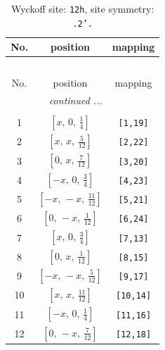 \documentclass[fleqn,8pt]{jsarticle}
\begin{document}
\begin{longtable}{ccc}
\caption{Wyckoff site: {\tt 12h}, site symmetry: {\tt .2'.}}
 \\
 \hline \hline
No. & position & mapping \\ \hline \endfirsthead

\multicolumn{2}{l}{\tablename\ \thetable{}} \\
 \hline \hline
No. & position & mapping \\ \hline \endhead

 \hline \hline
\multicolumn{2}{r}{\footnotesize\it continued ...} \\ \endfoot

 \hline \hline
\multicolumn{2}{r}{} \\ \endlastfoot

1 & $\left[ x,\, 0,\, \frac{1}{4} \right]$ & {\tt [1,19]} \\ \hline
2 & $\left[ x,\, x,\, \frac{5}{12} \right]$ & {\tt [2,22]} \\ \hline
3 & $\left[ 0,\, x,\, \frac{7}{12} \right]$ & {\tt [3,20]} \\ \hline
4 & $\left[ - x,\, 0,\, \frac{3}{4} \right]$ & {\tt [4,23]} \\ \hline
5 & $\left[ - x,\, - x,\, \frac{11}{12} \right]$ & {\tt [5,21]} \\ \hline
6 & $\left[ 0,\, - x,\, \frac{1}{12} \right]$ & {\tt [6,24]} \\ \hline
7 & $\left[ x,\, 0,\, \frac{3}{4} \right]$ & {\tt [7,13]} \\ \hline
8 & $\left[ 0,\, x,\, \frac{1}{12} \right]$ & {\tt [8,15]} \\ \hline
9 & $\left[ - x,\, - x,\, \frac{5}{12} \right]$ & {\tt [9,17]} \\ \hline
10 & $\left[ x,\, x,\, \frac{11}{12} \right]$ & {\tt [10,14]} \\ \hline
11 & $\left[ - x,\, 0,\, \frac{1}{4} \right]$ & {\tt [11,16]} \\ \hline
12 & $\left[ 0,\, - x,\, \frac{7}{12} \right]$ & {\tt [12,18]} \\
\end{longtable}
\renewcommand{\arraystretch}{1.2}
\end{document}
